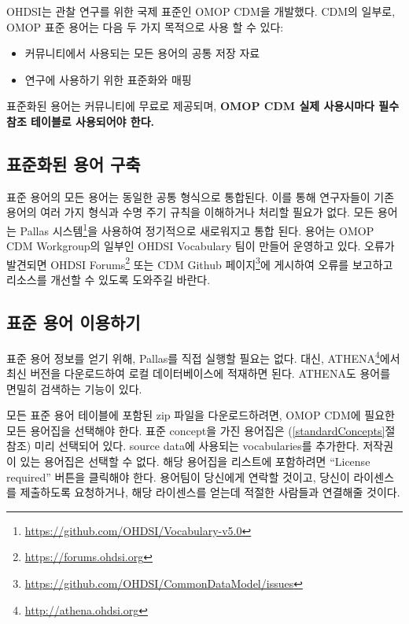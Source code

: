\documentclass[11pt]{book}
\providecommand{\tightlist}{%
  \setlength{\itemsep}{0pt}\setlength{\parskip}{0pt}}
\let\rmarkdownfootnote\footnote%
\def\footnote{\protect\rmarkdownfootnote}
\theoremstyle{definition}
\theoremstyle{definition}
\theoremstyle{definition}
\theoremstyle{remark}
\begin{document}
OHDSI는 관찰 연구를 위한 국제 표준인 OMOP CDM을 개발했다. CDM의 일부로,
OMOP 표준 용어는 다음 두 가지 목적으로 사용 할 수 있다:

\begin{itemize}
\tightlist
\item
  커뮤니티에서 사용되는 모든 용어의 공통 저장 자료
\item
  연구에 사용하기 위한 표준화와 매핑
\end{itemize}

표준화된 용어는 커뮤니티에 무료로 제공되며, \textbf{OMOP CDM 실제
사용시마다 필수 참조 테이블로 사용되어야 한다.}

\subsection{표준화된 용어 구축}\label{--}

표준 용어의 모든 용어는 동일한 공통 형식으로 통합된다. 이를 통해
연구자들이 기존 용어의 여러 가지 형식과 수명 주기 규칙을 이해하거나
처리할 필요가 없다. 모든 용어는 Pallas 시스템\footnote{\url{https://github.com/OHDSI/Vocabulary-v5.0}}을
사용하여 정기적으로 새로워지고 통합 된다. 용어는 OMOP CDM Workgroup의
일부인 OHDSI Vocabulary 팀이 만들어 운영하고 있다. 오류가 발견되면 OHDSI
Forums\footnote{\url{https://forums.ohdsi.org}} 또는 CDM Github
페이지\footnote{\url{https://github.com/OHDSI/CommonDataModel/issues}}에
게시하여 오류를 보고하고 리소스를 개선할 수 있도록 도와주길
바란다.

\subsection{표준 용어 이용하기}\label{accessVocabularies}

표준 용어 정보를 얻기 위해, Pallas를 직접 실행할 필요는 없다. 대신,
ATHENA\footnote{\url{http://athena.ohdsi.org}}에서 최신 버전을
다운로드하여 로컬 데이터베이스에 적재하면 된다. ATHENA도 용어를 면밀히
검색하는 기능이 있다. 

모든 표준 용어 테이블에 포함된 zip 파일을 다운로드하려면, OMOP CDM에
필요한 모든 용어집을 선택해야 한다. 표준 concept을 가진 용어집은
(\ref{standardConcepts}절 참조) 미리 선택되어 있다. source data에
사용되는 vocabularies를 추가한다. 저작권이 있는 용어집은 선택할 수 없다.
해당 용어집을 리스트에 포함하려면 ``License required'' 버튼을 클릭해야
한다. 용어팀이 당신에게 연락할 것이고, 당신이 라이센스를 제출하도록
요청하거나, 해당 라이센스를 얻는데 적절한 사람들과 연결해줄 것이다.
\end{document}
